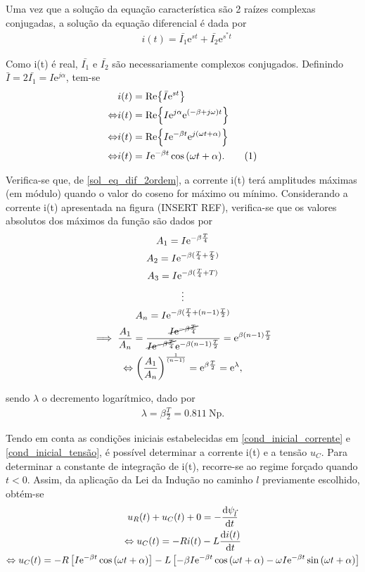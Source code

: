 \documentclass[a4paper, titlepage, portuguese]{article}
\newcommand{\eq}{\Leftrightarrow} %
\newcommand\numberthis{\addtocounter{equation}{1}\tag{\theequation}}
\newcommand\e{\mathrm{e} }
\begin{document}
		Uma vez que a solução da equação característica são 2 raízes complexas conjugadas, a solução da equação diferencial é dada por
		\begin{align*}
			&i(t) = \bar{I_1}\e^{st} + \bar{I_2}\e^{s^{*}t}
		\end{align*}

		Como i(t) é real, $\bar{I_{1}}$ e $\bar{I_{2}}$ são necessariamente complexos conjugados. Definindo $\bar{I} = 2\bar{I_1} = I\e^{j\alpha}$, tem-se
		\begin{align*}
			& i(t) = \Re{\bar{I}\e^{st}} \\ \eq
			& i(t) = \Re{I\e^{j\alpha}\e^{(-\beta + j\omega)t}} \\ \eq
			& i(t) = \Re{I\e^{-\beta t}\e^{j(\omega t + \alpha)}} \\ \eq
			& i(t) = I\e^{-\beta t} \cos{(\omega t + \alpha)}. \numberthis \label{sol_eq_dif_2ordem}
		\end{align*}

		Verifica-se que, de \ref{sol_eq_dif_2ordem}, a corrente i(t) terá amplitudes máximas (em módulo) quando o valor do coseno for máximo ou mínimo. Considerando a corrente i(t) apresentada na figura (INSERT REF), verifica-se que os valores absolutos dos máximos da função são dados por
		\begin{gather*}
			 A_1 = I\e^{-\beta \frac{T}{4}} \\
			 A_2 = I\e^{-\beta(\frac{T}{4} + \frac{T}{2})} \\
			 A_3 = I\e^{-\beta(\frac{T}{4} + T)}\\
			\vdots \\
			 A_n = I\e^{-\beta(\frac{T}{4} + (n-1)\frac{T}{2})} \\
			 \implies \frac{A_1}{A_n} = \frac{\cancel{I\e^{-\beta \frac{T}{4}}}}{\cancel{I\e^{-\beta\frac{T}{4}}} \e^{-\beta(n-1)\frac{T}{2}}} = \e^{\beta(n-1)\frac{T}{2}} \\ \eq
			 \left(\frac{A_1}{A_n}\right)^{\frac{1}{(n-1)}} = \e^{\beta\frac{T}{2}} = \e^\lambda,
		\end{gather*}

		sendo $\lambda$ o decremento logarítmico, dado por
		\begin{align*}
			 \lambda = \beta \frac{T}{2} = \SI{0.811}{\neper}.
		\end{align*}

		Tendo em conta as condições iniciais estabelecidas em \eqref{cond_inicial_corrente} e \eqref{cond_inicial_tensão}, é possível determinar a corrente i(t) e a tensão $u_{C}$. Para determinar a constante de integração de i(t), recorre-se ao regime forçado quando $t < 0$. Assim, da aplicação da Lei da Indução no caminho $l$ previamente escolhido, obtém-se 
		\begin{gather*}
			u_R(t) + u_C(t) + 0 = - \dv{\psi_{\vec{l}}}{t} \\ \eq
			u_C(t) = -Ri(t) - L\dv{i(t)}{t} \\ \eq
			u_C(t) = -R \left[ I\e^{-\beta t} \cos{(\omega t + \alpha)} \right] - L \left[ -\beta I\e^{-\beta t} \cos{(\omega t + \alpha)} - \omega I\e^{-\beta t} \sin{(\omega t + \alpha)}\right]
		\end{gather*}
		
\end{document}
